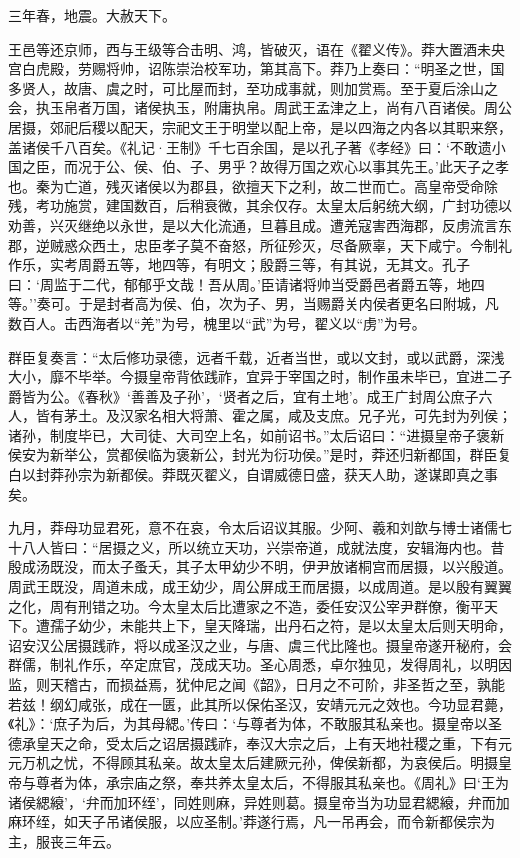 \documentclass[]{article}
\begin{document}
三年春，地震。大赦天下。

王邑等还京师，西与王级等合击明、鸿，皆破灭，语在《翟义传》。莽大置酒未央宫白虎殿，劳赐将帅，诏陈崇治校军功，第其高下。莽乃上奏曰：``明圣之世，国多贤人，故唐、虞之时，可比屋而封，至功成事就，则加赏焉。至于夏后涂山之会，执玉帛者万国，诸侯执玉，附庸执帛。周武王孟津之上，尚有八百诸侯。周公居摄，郊祀后稷以配天，宗祀文王于明堂以配上帝，是以四海之内各以其职来祭，盖诸侯千八百矣。《礼记·王制》千七百余国，是以孔子著《孝经》曰：`不敢遗小国之臣，而况于公、侯、伯、子、男乎？故得万国之欢心以事其先王。'此天子之孝也。秦为亡道，残灭诸侯以为郡县，欲擅天下之利，故二世而亡。高皇帝受命除残，考功施赏，建国数百，后稍衰微，其余仅存。太皇太后躬统大纲，广封功德以劝善，兴灭继绝以永世，是以大化流通，旦暮且成。遭羌寇害西海郡，反虏流言东郡，逆贼惑众西土，忠臣孝子莫不奋怒，所征殄灭，尽备厥辜，天下咸宁。今制礼作乐，实考周爵五等，地四等，有明文；殷爵三等，有其说，无其文。孔子曰：`周监于二代，郁郁乎文哉！吾从周。'臣请诸将帅当受爵邑者爵五等，地四等。''奏可。于是封者高为侯、伯，次为子、男，当赐爵关内侯者更名曰附城，凡数百人。击西海者以``羌''为号，槐里以``武''为号，翟义以``虏''为号。

群臣复奏言：``太后修功录德，远者千载，近者当世，或以文封，或以武爵，深浅大小，靡不毕举。今摄皇帝背依践祚，宜异于宰国之时，制作虽未毕已，宜进二子爵皆为公。《春秋》`善善及子孙'，`贤者之后，宜有土地'。成王广封周公庶子六人，皆有茅土。及汉家名相大将萧、霍之属，咸及支庶。兄子光，可先封为列侯；诸孙，制度毕已，大司徒、大司空上名，如前诏书。''太后诏曰：``进摄皇帝子褒新侯安为新举公，赏都侯临为褒新公，封光为衍功侯。''是时，莽还归新都国，群臣复白以封莽孙宗为新都侯。莽既灭翟义，自谓威德日盛，获天人助，遂谋即真之事矣。

九月，莽母功显君死，意不在哀，令太后诏议其服。少阿、羲和刘歆与博士诸儒七十八人皆曰：``居摄之义，所以统立天功，兴崇帝道，成就法度，安辑海内也。昔殷成汤既没，而太子蚤夭，其子太甲幼少不明，伊尹放诸桐宫而居摄，以兴殷道。周武王既没，周道未成，成王幼少，周公屏成王而居摄，以成周道。是以殷有翼翼之化，周有刑错之功。今太皇太后比遭家之不造，委任安汉公宰尹群僚，衡平天下。遭孺子幼少，未能共上下，皇天降瑞，出丹石之符，是以太皇太后则天明命，诏安汉公居摄践祚，将以成圣汉之业，与唐、虞三代比隆也。摄皇帝遂开秘府，会群儒，制礼作乐，卒定庶官，茂成天功。圣心周悉，卓尔独见，发得周礼，以明因监，则天稽古，而损益焉，犹仲尼之闻《韶》，日月之不可阶，非圣哲之至，孰能若兹！纲幻咸张，成在一匮，此其所以保佑圣汉，安靖元元之效也。今功显君薨，《礼》：`庶子为后，为其母緦。'传曰：`与尊者为体，不敢服其私亲也。摄皇帝以圣德承皇天之命，受太后之诏居摄践祚，奉汉大宗之后，上有天地社稷之重，下有元元万机之忧，不得顾其私亲。故太皇太后建厥元孙，俾侯新都，为哀侯后。明摄皇帝与尊者为体，承宗庙之祭，奉共养太皇太后，不得服其私亲也。《周礼》曰`王为诸侯緦縗'，`弁而加环绖'，同姓则麻，异姓则葛。摄皇帝当为功显君緦縗，弁而加麻环绖，如天子吊诸侯服，以应圣制。'莽遂行焉，凡一吊再会，而令新都侯宗为主，服丧三年云。
\end{document}
